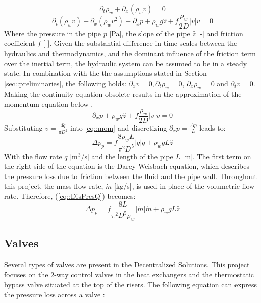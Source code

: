 \begin{equation}
\partial_t \rho_w+\partial_x\left(\rho_w v\right)=0
\end{equation}
\begin{equation}
\partial_t (\rho_w v)+\partial_x(\rho_w v^2)+ \partial_x p+\rho_w g \hat{z}  +f \frac{\rho_w}{2 D}|v| v=0
\end{equation}
Where the pressure in the pipe $p$ [Pa], the slope of the pipe $\hat{z}$ [-] and friction coefficient $f$ [-]. Given the substantial difference in time scales between the hydraulics and thermodynamics, and the dominant influence of the friction term over the inertial term, the hydraulic system can be assumed to be in a steady state. In combination with the the assumptions stated in Section \ref{sec::preliminaries}, the following holds: $\partial_x v = 0, \partial_t \rho_w = 0$, $\partial_x \rho_w = 0$ and $\partial_t v = 0$. Making the continuity equation obsolete results in the approximation of the momentum equation below \cite{sibeijn2025economic}. 
\begin{equation}\label{eq::mom}
\partial_x p + \rho_w g \hat{z} +f \frac{\rho_w}{2 D}\left|v\right| v=0
\end{equation}
Substituting $v = \frac{4 \dot{q}}{\pi D^2}$ into \eqref{eq::mom} and discretizing $\partial_x p = \frac{\Delta p}{L}$ leads to:
\begin{equation}\label{eq::DisPresQ}
    \Delta p_p =  f \frac{8\rho_w L}{\pi^2 D^5}\left|q\right| q + \rho_w g L \hat{z}
\end{equation}
With the flow rate $q$ [m$^3$/s] and the length of the pipe $L$ [m]. The first term on the right side of the equation is the Darcy-Weisbach equation, which describes the pressure loss due to friction between the fluid and the pipe wall. Throughout this project, the mass flow rate, $\dot{m}$ [kg/s], is used in place of the volumetric flow rate. Therefore, (\ref{eq::DisPresQ}) becomes:
\begin{equation}\label{eq::DisPresQ_mflow}
\Delta p_p = f\frac{8 L}{\pi^2 D^5 \rho_w} |\dot{m}|\dot{m} + \rho_w g L \hat{z}
\end{equation}

\subsection{Valves}\label{sec::valves}
Several types of valves are present in the Decentralized Solutions. This project focuses on the 2-way control valves in the heat exchangers and the thermostatic bypass valve situated at the top of the risers. The following equation can express the pressure loss across a valve \cite{Artikelphdchris}:

